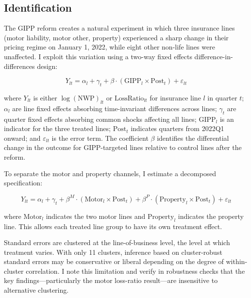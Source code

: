 \documentclass[12pt]{article}
\begin{document}
\subsection{Identification}

The GIPP reform creates a natural experiment in which three insurance lines (motor liability, motor other, property) experienced a sharp change in their pricing regime on January 1, 2022, while eight other non-life lines were unaffected. I exploit this variation using a two-way fixed effects difference-in-differences design:

\begin{equation}
Y_{lt} = \alpha_l + \gamma_t + \beta \cdot (\text{GIPP}_l \times \text{Post}_t) + \varepsilon_{lt}
\label{eq:did}
\end{equation}

\noindent where $Y_{lt}$ is either $\log(\text{NWP})_{lt}$ or $\text{LossRatio}_{lt}$ for insurance line $l$ in quarter $t$; $\alpha_l$ are line fixed effects absorbing time-invariant differences across lines; $\gamma_t$ are quarter fixed effects absorbing common shocks affecting all lines; $\text{GIPP}_l$ is an indicator for the three treated lines; $\text{Post}_t$ indicates quarters from 2022Q1 onward; and $\varepsilon_{lt}$ is the error term. The coefficient $\beta$ identifies the differential change in the outcome for GIPP-targeted lines relative to control lines after the reform.

To separate the motor and property channels, I estimate a decomposed specification:

\begin{equation}
Y_{lt} = \alpha_l + \gamma_t + \beta^M \cdot (\text{Motor}_l \times \text{Post}_t) + \beta^P \cdot (\text{Property}_l \times \text{Post}_t) + \varepsilon_{lt}
\label{eq:decomp}
\end{equation}

\noindent where $\text{Motor}_l$ indicates the two motor lines and $\text{Property}_l$ indicates the property line. This allows each treated line group to have its own treatment effect.

Standard errors are clustered at the line-of-business level, the level at which treatment varies. With only 11 clusters, inference based on cluster-robust standard errors may be conservative or liberal depending on the degree of within-cluster correlation. I note this limitation and verify in robustness checks that the key findings---particularly the motor loss-ratio result---are insensitive to alternative clustering.
\end{document}

